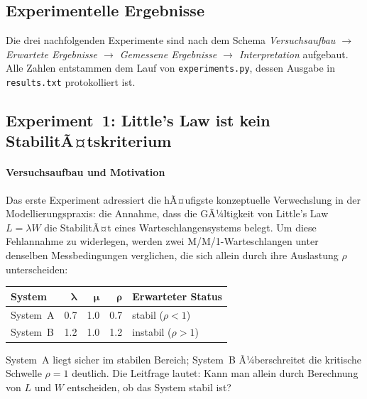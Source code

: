 ﻿\documentclass[a4paper,12pt]{report}
\theoremstyle{definition}
\begin{document}
\subsection{Experimentelle Ergebnisse}
\label{sec:experimentelle-ergebnisse}
\label{subsec:experimente}

Die drei nachfolgenden Experimente sind nach dem Schema
\emph{Versuchsaufbau $\to$ Erwartete Ergebnisse $\to$ Gemessene
	Ergebnisse $\to$ Interpretation} aufgebaut.  Alle Zahlen entstammen
dem Lauf von \texttt{experiments.py}, dessen Ausgabe in
\texttt{results.txt} protokolliert ist.

\subsection{Experiment~1: Little's Law ist kein StabilitÃ¤tskriterium}
\label{subsubsec:exp1}

\paragraph{Versuchsaufbau und Motivation}

Das erste Experiment adressiert die hÃ¤ufigste konzeptuelle
Verwechslung in der Modellierungspraxis: die Annahme, dass die
GÃ¼ltigkeit von Little's Law $L = \lambda W$ die StabilitÃ¤t eines
Warteschlangensystems belegt.  Um diese Fehlannahme zu widerlegen,
werden zwei M/M/1-Warteschlangen unter denselben Messbedingungen
verglichen, die sich allein durch ihre Auslastung $\rho$ unterscheiden:

\begin{center}
	\begin{tabular}{@{}lrrrl@{}}
		\toprule
		\textbf{System} & $\boldsymbol{\lambda}$ & $\boldsymbol{\mu}$ &
		$\boldsymbol{\rho}$ & \textbf{Erwarteter Status} \\
		\midrule
		System~A & 0.7 & 1.0 & 0.7 & stabil ($\rho < 1$) \\
		System~B & 1.2 & 1.0 & 1.2 & instabil ($\rho > 1$) \\
		\bottomrule
	\end{tabular}
\end{center}

System~A liegt sicher im stabilen Bereich; System~B Ã¼berschreitet die
kritische Schwelle $\rho = 1$ deutlich.  Die Leitfrage lautet: Kann
man allein durch Berechnung von $L$ und $W$ entscheiden, ob das System
stabil ist?
\end{document}
